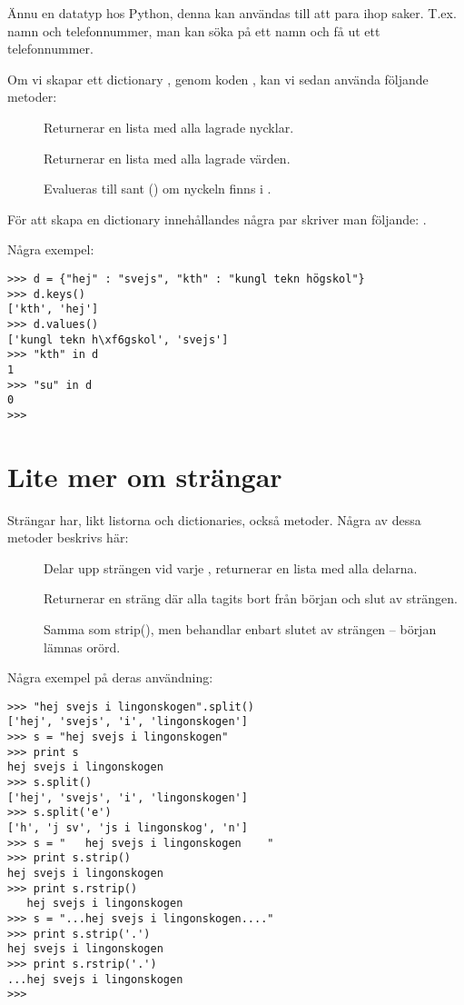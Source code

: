 Ännu en datatyp hos Python, denna kan användas till att para ihop saker. T.ex.
namn och telefonnummer, man kan söka på ett namn och få ut ett telefonnummer.

Om vi skapar ett dictionary , genom koden , kan vi sedan
använda följande metoder:

\begin{description}
\item[] Returnerar en lista med alla lagrade nycklar.
\item[] Returnerar en lista med alla lagrade värden.
\item[] Evalueras till sant () om nyckeln 
	finns i .
\end{description}

För att skapa en dictionary innehållandes några par skriver man följande:
.

Några exempel:
\begin{lstlisting}[style=text]
>>> d = {"hej" : "svejs", "kth" : "kungl tekn högskol"}
>>> d.keys()
['kth', 'hej']
>>> d.values()
['kungl tekn h\xf6gskol', 'svejs']
>>> "kth" in d
1
>>> "su" in d
0
>>>
\end{lstlisting}



\section{Lite mer om strängar}

Strängar har, likt listorna och dictionaries, också metoder. Några av dessa
metoder beskrivs här:

\begin{description}
\item[] Delar upp strängen vid varje , returnerar en
	lista med alla delarna.
\item[] Returnerar en sträng där alla  tagits bort från
	början och slut av strängen.
\item[] Samma som strip(), men behandlar enbart slutet av
	strängen -- början lämnas orörd.
\end{description}

Några exempel på deras användning:
\begin{lstlisting}[style=text]
>>> "hej svejs i lingonskogen".split()
['hej', 'svejs', 'i', 'lingonskogen']
>>> s = "hej svejs i lingonskogen"
>>> print s
hej svejs i lingonskogen
>>> s.split()
['hej', 'svejs', 'i', 'lingonskogen']
>>> s.split('e')
['h', 'j sv', 'js i lingonskog', 'n']
>>> s = "   hej svejs i lingonskogen    "
>>> print s.strip()
hej svejs i lingonskogen
>>> print s.rstrip()
   hej svejs i lingonskogen
>>> s = "...hej svejs i lingonskogen...."
>>> print s.strip('.')
hej svejs i lingonskogen
>>> print s.rstrip('.')
...hej svejs i lingonskogen
>>>
\end{lstlisting}



